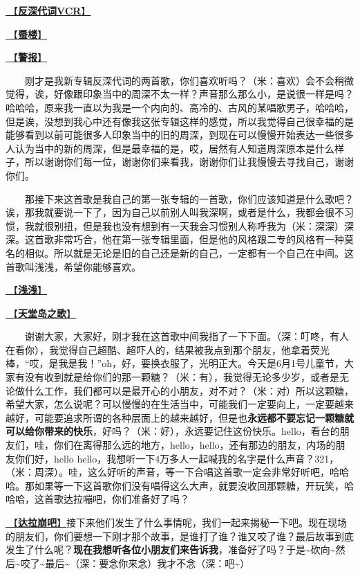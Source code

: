 \documentclass[]{ctexbook}
\begin{document}
\hyperref[senself-vcr]{🎥【\textbf{反深代词VCR}】}

\hyperref[mirage]{🎵【\textbf{蜃楼}】}

\hyperref[the-giver]{🎵【\textbf{警报}】}

  刚才是我新专辑反深代词的两首歌，你们喜欢听吗？（米：喜欢）会不会稍微觉得，诶，好像跟印象当中的周深不太一样？声音那么那么小，是说很一样是吗？哈哈哈，原来我一直以为我是一个内向的、高冷的、古风的某唱歌男子，哈哈哈，但是诶，没想到我心中还有像我这张专辑这样的感觉，所以我觉得自己很幸福的是能够看到以前可能很多人印象当中的旧的周深，到现在可以慢慢开始表达一些很多人认为当中的新的周深，但是最幸福的是，哎，居然有人知道周深原本是什么样子，所以谢谢你们每一位，谢谢你们来看我，谢谢你们让我慢慢去寻找自己，谢谢你们。

  那接下来这首歌是我自己的第一张专辑的一首歌，你们应该知道是什么歌吧？诶，那我就要说一下了，因为自己以前别人叫我深啊，或者是什么，我都会很不习惯，我就很别扭，但是我也没有想到有一天我会习惯别人称呼我为（米：深深）深深。这首歌非常巧合，他在第一张专辑里面，但是他的风格跟二专的风格有一种莫名的相似。所以就是无论是旧的自己还是新的自己，一定都有一个自己在中间。这首歌叫浅浅，希望你能够喜欢。

\hyperref[qianqian]{🎵【\textbf{浅浅}】}

\hyperref[haven-song]{🎵【\textbf{天堂岛之歌}】}

  谢谢大家，大家好，刚才我在这首歌中间我指了一下下面。（深：叮咚，有人在看你），我觉得自己超酷、超吓人的，结果被我点到那个朋友，他拿着荧光棒，``哎，是我是我！''oh，好，要换衣服了，光明正大。今天是6月1号儿童节，大家有没有收到就是给你们的那一颗糖？（米：有），我觉得无论多少岁，或者是无论做什么工作，我们都可以是最开心的小朋友，对不对？（米：对）所以这颗糖，希望大家，怎么说呢？可以慢慢的在生活当中，可能我们一定要向上，一定要越来越好，可能要追求所谓的各种层面上的越来越好，但是也\textbf{永远都不要忘记一颗糖就可以给你带来的快乐}，好吗？（米：好），永远要记住这份快乐。hello，看台的朋友们，哇，你们在离得那么远的地方，hello，hello，还有那边的朋友，内场的朋友你们好，hello hello，我想听一下4万多人一起喊我的名字是什么声音？321，（米：周深）。哇，这么好听的声音，等一下合唱这首歌一定会非常好听吧，哈哈哈。那如果等一下这首歌你们没有唱得这么大声，就要没收回那颗糖，开玩笑，哈哈哈，这首歌达拉嘣吧，你们准备好了吗？

\hyperref[dalabengba]{🎵【\textbf{达拉崩吧}】}接下来他们发生了什么事情呢，我们一起来揭秘一下吧。现在现场的朋友们，你们要想一下刚才那个故事，是谁打了谁？谁又咬了谁？最后故事到底发生了什么呢？\textbf{现在我想听各位小朋友们来告诉我}，准备好了吗？于是\textasciitilde 砍向\textasciitilde 然后\textasciitilde 咬了\textasciitilde 最后\textasciitilde（深：要念你来念）我才不念（深：吧\textasciitilde）
\end{document}
